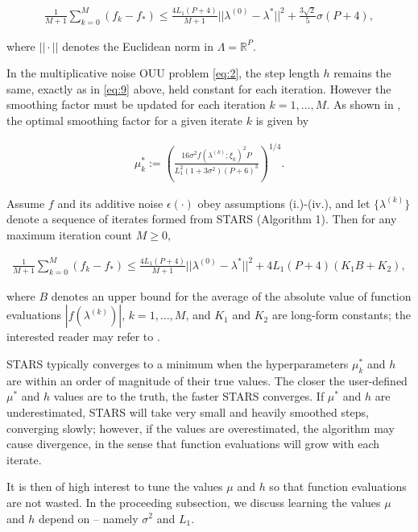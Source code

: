 \documentclass{amsart}
\newcommand{\R}{\mathbb{R}}
\begin{document}
\begin{eqnarray} \label{eq:10}
\frac{1}{M+1} \sum_{k=0}^M (f_k-f_*) \leq \frac{4L_1(P+4)}{M+1}||\lambda^{(0)}-\lambda^*||^2 + \frac{3 \sqrt{2}}{5} \sigma (P+4),
\end{eqnarray} 

\noindent where $||\cdot||$ denotes the Euclidean norm in $\Lambda= \R^P$.

In the multiplicative noise OUU problem \eqref{eq:2}, the step length $h$ remains the same, exactly as in \eqref{eq:9} above, held constant for each iteration. However the smoothing factor must be updated for each iteration $k=1,\ldots, M.$ As shown in \cite{CW}, the optimal smoothing factor for a given iterate $k$ is given by

\begin{eqnarray} \label{eq:11}
\mu^*_k:=\left( \frac{16 \sigma^2 f(\lambda^{(k)};\xi_k)^2 P}{L_1^2(1+3\sigma^2)(P+6)^3}\right)^{1/4}.
\end{eqnarray} 

Assume $f$ and its additive noise $\epsilon(\cdot)$ obey assumptions (i.)-(iv.), and let $\{\lambda^{(k)}\}$ denote a sequence of iterates formed from STARS (Algorithm 1). Then for any maximum iteration count $M \geq 0$,

\begin{eqnarray} \label{eq:12}
\frac{1}{M+1} \sum_{k=0}^M (f_k-f_*) \leq \frac{4L_1(P+4)}{M+1}||\lambda^{(0)}-\lambda^*||^2 + 4L_1(P+4)(K_1B +K_2),
\end{eqnarray} 


\noindent where $B$ denotes an upper bound for the average of the absolute value of function evaluations $|f(\lambda^{(k)})|$, $k=1,\ldots,M$, and $K_1$ and $K_2$ are long-form constants; the interested reader may refer to \cite{CW}.

STARS typically converges to a minimum when the hyperparameters $\mu_k^*$ and $h$ are within an order of magnitude of their true values. The closer the user-defined $\mu^*$ and $h$ values are to the truth, the faster STARS converges. If $\mu^*$ and $h$ are underestimated, STARS will take very small and heavily smoothed steps, converging slowly; however, if the values are overestimated, the algorithm may cause divergence, in the sense that function evaluations will grow with each iterate.

It is then of high interest to tune the values $\mu$ and $h$ so that function evaluations are not wasted. In the proceeding subsection, we discuss learning the values $\mu$ and $h$ depend on -- namely $\sigma^2$ and $L_1$.
\end{document}
